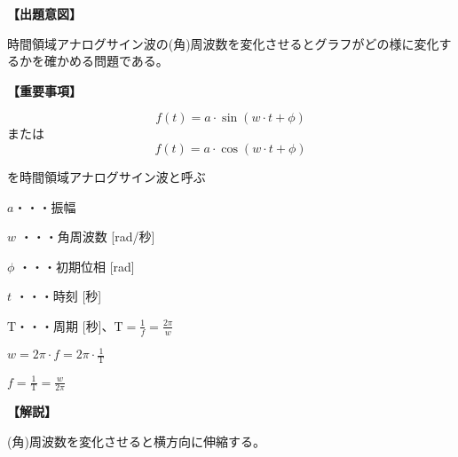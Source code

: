 \noindent \textbf{【出題意図】}

\noindent 時間領域アナログサイン波の(角)周波数を変化させるとグラフがどの様に変化するかを確かめる問題である。

\vspace{1em}
\noindent \textbf{【重要事項】}

\[
f(t) = a \cdot \sin( w \cdot t + \phi )
\]
%
\noindent または
%
\[
f(t) = a \cdot \cos( w \cdot t + \phi )
\]

\medskip
\noindent を時間領域アナログサイン波と呼ぶ

\bigskip
\noindent $a$・・・振幅

\bigskip
\noindent $w$ ・・・角周波数 [rad/秒]

\bigskip
\noindent $\phi$ ・・・初期位相 [rad]

\bigskip
\noindent $t$ ・・・時刻 [秒]

\bigskip
$\textrm{T}$・・・周期 [秒]、$\textrm{T} = \frac{1}{f} = \frac{2\pi}{w}$

\bigskip
$w = 2\pi \cdot f = 2 \pi \cdot \frac{1}{\textrm{T}}$

\bigskip
$f = \frac{1}{\textrm{T}} = \frac{w}{2\pi}$

\vspace{1em}
\noindent \textbf{【解説】}

\noindent (角)周波数を変化させると横方向に伸縮する。
